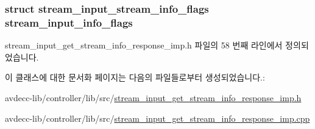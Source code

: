 \subsubsection[{\texorpdfstring{stream\+\_\+input\+\_\+info\+\_\+flags}{stream_input_info_flags}}]{\setlength{\rightskip}{0pt plus 5cm}struct {\bf stream\+\_\+input\+\_\+stream\+\_\+info\+\_\+flags} stream\+\_\+input\+\_\+info\+\_\+flags\hspace{0.3cm}{\ttfamily [private]}}\hypertarget{classavdecc__lib_1_1stream__input__get__stream__info__response__imp_a7850eefaf805546923263be01f1a2ec3}{}\label{classavdecc__lib_1_1stream__input__get__stream__info__response__imp_a7850eefaf805546923263be01f1a2ec3}


stream\+\_\+input\+\_\+get\+\_\+stream\+\_\+info\+\_\+response\+\_\+imp.\+h 파일의 58 번째 라인에서 정의되었습니다.



이 클래스에 대한 문서화 페이지는 다음의 파일들로부터 생성되었습니다.\+:\begin{DoxyCompactItemize}
\item 
avdecc-\/lib/controller/lib/src/\hyperlink{stream__input__get__stream__info__response__imp_8h}{stream\+\_\+input\+\_\+get\+\_\+stream\+\_\+info\+\_\+response\+\_\+imp.\+h}\item 
avdecc-\/lib/controller/lib/src/\hyperlink{stream__input__get__stream__info__response__imp_8cpp}{stream\+\_\+input\+\_\+get\+\_\+stream\+\_\+info\+\_\+response\+\_\+imp.\+cpp}\end{DoxyCompactItemize}
